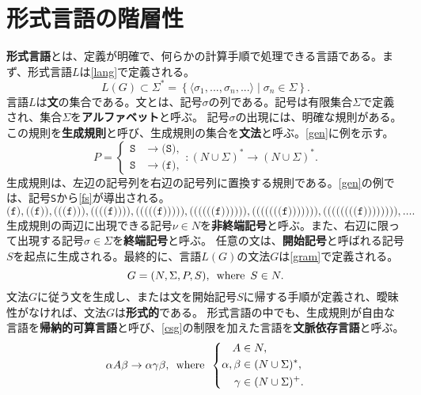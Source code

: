 \documentclass[10pt,a4paper]{book}
\begin{document}
\section{形式言語の階層性\label{sect:lang}}

\textbf{形式言語}とは、定義が明確で、何らかの計算手順で処理できる言語である。まず、形式言語$L$は\eqref{lang}で定義される。
%
\begin{equation}
\label{eq:lang}
L(G) \subset \Sigma^* = \left\{\langle\sigma_1,...,\sigma_n,...\rangle\mid\sigma_n\in\Sigma\right\}.
\end{equation}
%
言語$L$は\textbf{文}の集合である。文とは、記号$\sigma$の列である。記号は有限集合$\Sigma$で定義され、集合$\Sigma$を\textbf{アルファベット}と呼ぶ。
記号$\sigma$の出現には、明確な規則がある。この規則を\textbf{生成規則}と呼び、生成規則の集合を\textbf{文法}と呼ぶ。\eqref{gen}に例を示す。
%
\begin{equation}
\label{eq:gen}
P = \left\{
\begin{aligned}
\mathtt{S} &\to \texttt{(S)},\\
\mathtt{S} &\to \texttt{(f)},
\end{aligned}
\right.:(N\cup\Sigma)^*\to(N\cup\Sigma)^*.
\end{equation}
%
生成規則は、左辺の記号列を右辺の記号列に置換する規則である。\eqref{gen}の例では、記号\texttt{S}から\eqref{fs}が導出される。
%
\begin{equation}
\label{eq:fs}
\texttt{(f)},
\texttt{((f))},
\texttt{(((f)))},
\texttt{((((f))))},
\texttt{(((((f)))))},
\texttt{((((((f))))))},
\texttt{(((((((f)))))))},
\texttt{((((((((f))))))))},
\ldots.
\end{equation}
%
生成規則の両辺に出現できる記号$\nu\!\in\!N$を\textbf{非終端記号}と呼ぶ。また、右辺に限って出現する記号$\sigma\!\in\!\Sigma$を\textbf{終端記号}と呼ぶ。
任意の文は、\textbf{開始記号}と呼ばれる記号$S$を起点に生成される。最終的に、言語$L(G)$の文法$G$は\eqref{gram}で定義される。
%
\begin{equation}
\label{eq:gram}
G=(N,\Sigma,P,S),\enspace\mathrm{where}\enspace S\in N.
\end{equation}
%
文法$G$に従う文を生成し、または文を開始記号$S$に帰する手順が定義され、曖昧性がなければ、文法$G$は\textbf{形式的}である。
形式言語の中でも、生成規則が自由な言語を\textbf{帰納的可算言語}と呼び、\eqref{csg}の制限を加えた言語を\textbf{文脈依存言語}と呼ぶ。
%
\begin{equation}
\label{eq:csg}
\alpha A \beta \to \alpha \gamma \beta,
\enspace\mathrm{where}\enspace
\left\{
\begin{aligned}
A &\in N,\\
\alpha,\beta &\in (N\cup\Sigma)^*,\\
\gamma &\in (N\cup\Sigma)^+.
\end{aligned}
\right.
\end{equation}
\end{document}

